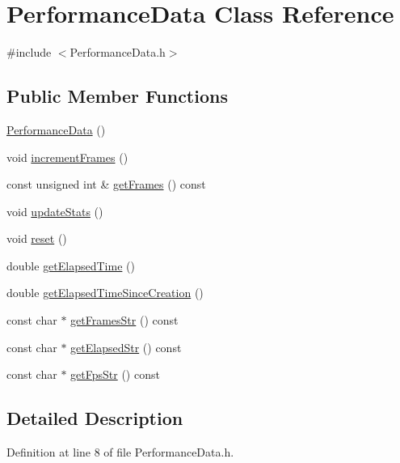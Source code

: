 \hypertarget{class_performance_data}{}\section{Performance\+Data Class Reference}
\label{class_performance_data}


{\ttfamily \#include $<$Performance\+Data.\+h$>$}

\subsection*{Public Member Functions}
\begin{DoxyCompactItemize}
\item 
\hyperlink{class_performance_data_a7766088fec48f94afcf784c027e0ee5d}{Performance\+Data} ()
\item 
void \hyperlink{class_performance_data_ac852244b141ba327f30da7a5fd586d49}{increment\+Frames} ()
\item 
const unsigned int \& \hyperlink{class_performance_data_a9ffcce90095cc9614f88b6ac25ff129d}{get\+Frames} () const
\item 
void \hyperlink{class_performance_data_a622d01a9d885596c79a799f03676c990}{update\+Stats} ()
\item 
void \hyperlink{class_performance_data_a5a19e35de26351c6983f069d25ec5a95}{reset} ()
\item 
double \hyperlink{class_performance_data_a54bcba973a7989024433e6d905140362}{get\+Elapsed\+Time} ()
\item 
double \hyperlink{class_performance_data_a803d0b8ed600dff6100c8c486c599527}{get\+Elapsed\+Time\+Since\+Creation} ()
\item 
const char $\ast$ \hyperlink{class_performance_data_a9f96571086d202296dd4bc3d799b4ac0}{get\+Frames\+Str} () const
\item 
const char $\ast$ \hyperlink{class_performance_data_a083aeabd3aa06b3420b2afdbc6e0e3d1}{get\+Elapsed\+Str} () const
\item 
const char $\ast$ \hyperlink{class_performance_data_aa30d1d2ea4889a3cacc726e4487c7b78}{get\+Fps\+Str} () const
\end{DoxyCompactItemize}


\subsection{Detailed Description}


Definition at line 8 of file Performance\+Data.\+h.



